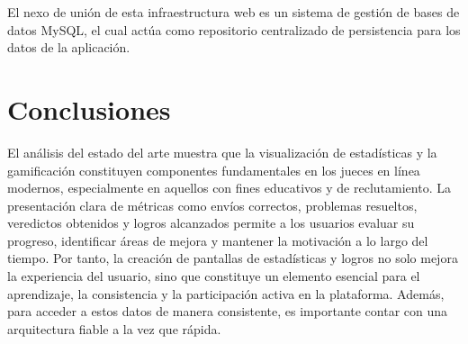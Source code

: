 El nexo de unión de esta infraestructura web es un sistema de gestión de bases de datos MySQL, el cual actúa como repositorio centralizado de persistencia para los datos de la aplicación.

\section{Conclusiones}

El análisis del estado del arte muestra que la visualización de estadísticas y la gamificación constituyen componentes fundamentales en los jueces en línea modernos, especialmente en aquellos con fines educativos y de reclutamiento. La presentación clara de métricas como envíos correctos, problemas resueltos, veredictos obtenidos y logros alcanzados permite a los usuarios evaluar su progreso, identificar áreas de mejora y mantener la motivación a lo largo del tiempo. Por tanto, la creación de pantallas de estadísticas y logros no solo mejora la experiencia del usuario, sino que constituye un elemento esencial para el aprendizaje, la consistencia y la participación activa en la plataforma. Además, para acceder a estos datos de manera consistente, es importante contar con una arquitectura fiable a la vez que rápida.